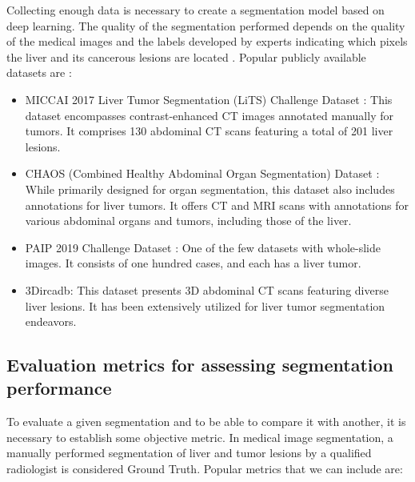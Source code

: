 Collecting enough data is necessary to create a segmentation model based on deep learning. The quality of the segmentation performed depends on the quality of the medical images and the labels developed by experts indicating which pixels the liver and its cancerous lesions are located \cite{liu_review_2021}. Popular publicly available datasets are :
\begin{itemize}
    \item MICCAI 2017 Liver Tumor Segmentation (LiTS) Challenge Dataset \cite{bilic_liver_2023}: This dataset encompasses contrast-enhanced CT images annotated manually for tumors. It comprises 130 abdominal CT scans featuring a total of 201 liver lesions. \label{sec:lits}
    \item CHAOS (Combined Healthy Abdominal Organ Segmentation) Dataset \cite{kavur_chaos_2021}: While primarily designed for organ segmentation, this dataset also includes annotations for liver tumors. It offers CT and MRI scans with annotations for various abdominal organs and tumors, including those of the liver.
    \item PAIP 2019 Challenge Dataset \cite{kim_paip_2021}: One of the few datasets with whole-slide images. It consists of one hundred cases, and each has a liver tumor.
    \item 3Dircadb: This dataset presents 3D abdominal CT scans featuring diverse liver lesions. It has been extensively utilized for liver tumor segmentation endeavors.
\end{itemize}


\subsection{Evaluation metrics for assessing segmentation performance}

To evaluate a given segmentation and to be able to compare it with another, it is necessary to establish some objective metric. In medical image segmentation, a manually performed segmentation of liver and tumor lesions by a qualified radiologist is considered Ground Truth. Popular metrics that we can include are:

